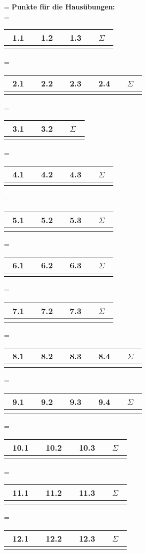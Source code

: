 \documentclass[twoside]{article}
\begin{document}
\begin{center}
	\ifnum\Table=\True
	\textbf{Punkte für die Hausübungen:}\\
	\vspace{1cm}
	\ifnum\ZettelEins=\True
	\begin{tabular}{c|c|c|c}
	~1.1~&~1.2~&~1.3~&~$\Sigma$~	\\	\hline
		 &	   &	 &
	\end{tabular}
	\fi
	\ifnum\ZettelZwei=\True
	\begin{tabular}{c|c|c|c|c}
	~2.1~&~2.2~&~2.3~&~2.4~&~$\Sigma$~	\\	\hline
		 &	   &	 &		&
	\end{tabular}
	\fi
	\ifnum\ZettelDrei=\True
	\begin{tabular}{c|c|c}
	~3.1~&~3.2~&~$\Sigma$~	\\	\hline
		 &	   &
	\end{tabular}
	\fi
	\ifnum\ZettelVier=\True
	\begin{tabular}{c|c|c|c}
	~4.1~&~4.2~&~4.3~&~$\Sigma$~	\\	\hline
		 &	   &	 &
	\end{tabular}
	\fi
	\ifnum\ZettelFuenf=\True
	\begin{tabular}{c|c|c|c}
	~5.1~&~5.2~&~5.3~&~$\Sigma$~	\\	\hline
		 &	   &	 &
	\end{tabular}
	\fi
	\ifnum\ZettelSechs=\True
	\begin{tabular}{c|c|c|c}
	~6.1~&~6.2~&~6.3~&~$\Sigma$~	\\	\hline
		 &	   &	 &
	\end{tabular}
	\fi
	\ifnum\ZettelSieben=\True
	\begin{tabular}{c|c|c|c}
	~7.1~&~7.2~&~7.3~&~$\Sigma$~	\\	\hline
		 &	   &	 &
	\end{tabular}
	\fi
	\ifnum\ZettelAcht=\True
	\begin{tabular}{c|c|c|c|c}
	~8.1~&~8.2~&~8.3~&~8.4~&~$\Sigma$~	\\	\hline
		 &	   &	  &		&
	\end{tabular}
	\fi
	\ifnum\ZettelNeun=\True
	\begin{tabular}{c|c|c|c|c}
	~9.1~&~9.2~&~9.3~&~9.4~&~$\Sigma$~	\\	\hline
		 &	   &	 &		&
	\end{tabular}
	\fi
	\ifnum\ZettelZehn=\True
	\begin{tabular}{c|c|c|c}
	~10.1~&~10.2~&~10.3~&~$\Sigma$~	\\	\hline
		 &	   &	 &
	\end{tabular}
	\fi
	\ifnum\ZettelElf=\True
	\begin{tabular}{c|c|c|c}
	~11.1~&~11.2~&~11.3~&~$\Sigma$~	\\	\hline
		 &	   &	 &
	\end{tabular}
	\fi
	\ifnum\ZettelZwoelf=\True
	\begin{tabular}{c|c|c|c}
	~12.1~&~12.2~&~12.3~&~$\Sigma$~	\\	\hline
		 &	   &	 &
	\end{tabular}
	\fi
	\fi
	
\end{center}
\newpage
\fi
\end{document}
